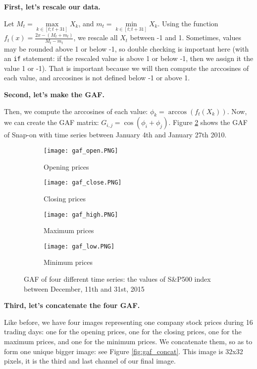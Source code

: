 \documentclass[11pt]{article}
\newcommand{\code}[1]{\colorbox{light-gray}{\texttt{#1}}}
\begin{document}
\begin{onehalfspace}
\noindent \textbf{First, let's rescale our data.}

Let $M_t = \max\limits_{k \in [t;t+31]} X_k$, and $m_t = \min\limits_{k \in [t;t+31]} X_k$. Using the function $f_t(x) = \frac{2 x - (M_t + m_t)}{M_t - m_t}$, we rescale all $X_t$ between -1 and 1. Sometimes, values may be rounded above 1 or below -1, so double checking is important here (with an \code{if} statement: if the rescaled value is above 1 or below -1, then we assign it the value 1 or -1). That is important because we will then compute the arccosines of each value, and arccosines is not defined below -1 or above 1.

\noindent \textbf{Second, let's make the GAF.}

Then, we compute the arccosines of each value: $\phi_k = \arccos(f_t(X_k))$. Now, we can create the GAF matrix: $G_{i,j} = \cos(\phi_i + \phi_j)$. Figure \ref{fig:gaf4} shows the GAF of Snap-on with time series between January 4th and January 27th 2010.

\begin{figure}[h!]
    \centering
    \captionsetup{justification=centering}
    \begin{subfigure}{0.24\textwidth}
        \texttt{[image: gaf\_open.PNG]}
        \caption{Opening prices}
        \label{fig:open_concat}
    \end{subfigure}
    \begin{subfigure}{0.24\textwidth}
        \texttt{[image: gaf\_close.PNG]}
        \caption{Closing prices}
    \end{subfigure}
    \begin{subfigure}{0.24\textwidth}
        \texttt{[image: gaf\_high.PNG]}
        \caption{Maximum prices}
    \end{subfigure}    
    \begin{subfigure}{0.24\textwidth}
        \texttt{[image: gaf\_low.PNG]}
        \caption{Minimum prices}
    \end{subfigure}
    \caption{GAF of four different time series: the values of S\&P500 index between December, 11th and 31st, 2015}
    \label{fig:gaf4}
\end{figure}

\noindent \textbf{Third, let's concatenate the four GAF.}

Like before, we have four images representing one company stock prices during 16 trading days: one for the opening prices, one for the closing prices, one for the maximum prices, and one for the minimum prices. We concatenate them, so as to form one unique bigger image: see Figure \ref{fig:gaf_concat}. This image is 32x32 pixels, it is the third and last channel of our final image. 


\end{onehalfspace}
\end{document}
